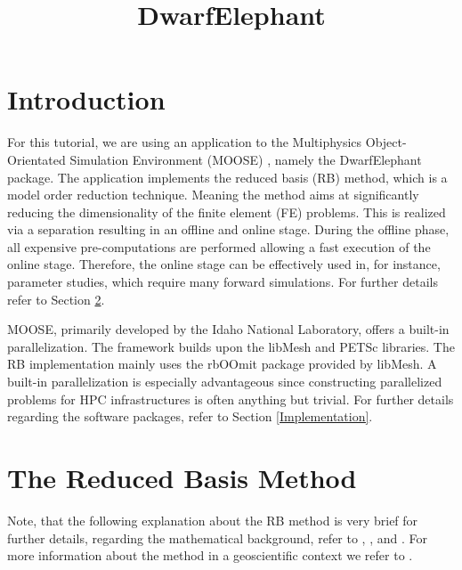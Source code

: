 \documentclass[11pt, a4paper, DIV=14]{scrartcl}
\begin{document}
\title{DwarfElephant}\label{DwarfElephantTutorial}

\maketitle

\section{Introduction}
For this tutorial, we are using an application to the Multiphysics Object-Orientated Simulation Environment (MOOSE) \cite{moose-web-page, tonks_et_al}, namely the DwarfElephant package. The application implements the reduced basis (RB) method, which is a model order reduction technique. Meaning the method aims at significantly reducing the dimensionality of the finite element (FE) problems. This is realized via a separation resulting in an offline and online stage. During the offline phase, all expensive pre-computations are performed allowing a fast execution of the online stage. Therefore, the online stage can be effectively used in, for instance, parameter studies, which require many forward simulations. For further details refer to Section \ref{Theory_DE}.

MOOSE, primarily developed by the Idaho National Laboratory, offers a built-in parallelization. The framework builds upon the libMesh \cite{kirk_et_al} and PETSc \cite{balay_et_al} libraries. The RB implementation mainly uses the rbOOmit package provided by libMesh. A built-in parallelization is especially advantageous since constructing parallelized problems for HPC infrastructures is often anything but trivial. For further details regarding the software packages, refer to Section \ref{Implementation}.

\section{The Reduced Basis Method} \label{Theory_DE}
Note, that the following explanation about the RB method is very brief for further details, regarding the mathematical background, refer to \cite{prud_et_al}, \cite{quarteroni_et_al}, and \cite{hest_et_al}. For more information about the method in a geoscientific context we refer to \cite{degen_et_al}.
\end{document}
